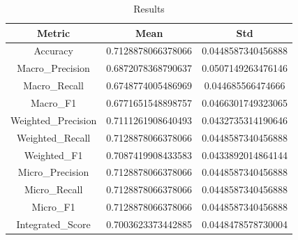 \begin{table}[htbp]
\centering
\caption{Results}
\label{tab:csv}
\small
\setlength{\tabcolsep}{4pt}
\begin{tabular}{|c|c|c|}
\hline
Metric & Mean & Std \\
\hline
Accuracy & 0.7128878066378066 & 0.0448587340456888 \\
Macro_Precision & 0.6872078368790637 & 0.0507149263476146 \\
Macro_Recall & 0.6748774005486969 & 0.044685566474666 \\
Macro_F1 & 0.6771651548898757 & 0.0466301749323065 \\
Weighted_Precision & 0.7111261908640493 & 0.0432735314190646 \\
Weighted_Recall & 0.7128878066378066 & 0.0448587340456888 \\
Weighted_F1 & 0.7087419908433583 & 0.0433892014864144 \\
Micro_Precision & 0.7128878066378066 & 0.0448587340456888 \\
Micro_Recall & 0.7128878066378066 & 0.0448587340456888 \\
Micro_F1 & 0.7128878066378066 & 0.0448587340456888 \\
Integrated_Score & 0.7003623373442885 & 0.0448478578730004 \\
\hline
\end{tabular}
\end{table}